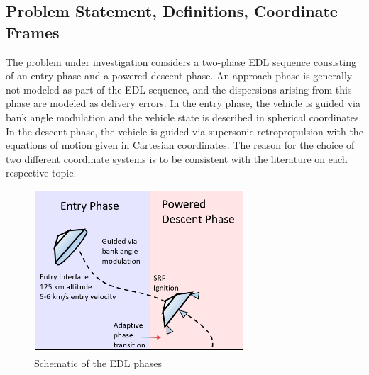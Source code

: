 \documentclass[letterpaper, preprint, paper,11pt]{AAS}
\begin{document}

\subsection{Problem Statement, Definitions, Coordinate Frames}
The problem under investigation considers a two-phase EDL sequence consisting of an entry phase and a powered descent phase. An approach phase is generally not modeled as part of the EDL sequence, and the dispersions arising from this phase are modeled as delivery errors. In the entry phase, the vehicle is guided via bank angle modulation and the vehicle state is described in spherical coordinates. In the descent phase, the vehicle is guided via supersonic retropropulsion with the equations of motion given in Cartesian coordinates.  The reason for the choice of two different coordinate systems is to be consistent with the literature on each respective topic.

\begin{figure}[h!]
	\centering
	\includegraphics[width=0.7\textwidth]{EDLPhaseDiagram} 
	\caption{Schematic of the EDL phases}
	\label{fig_phases}
\end{figure}
\end{document}
